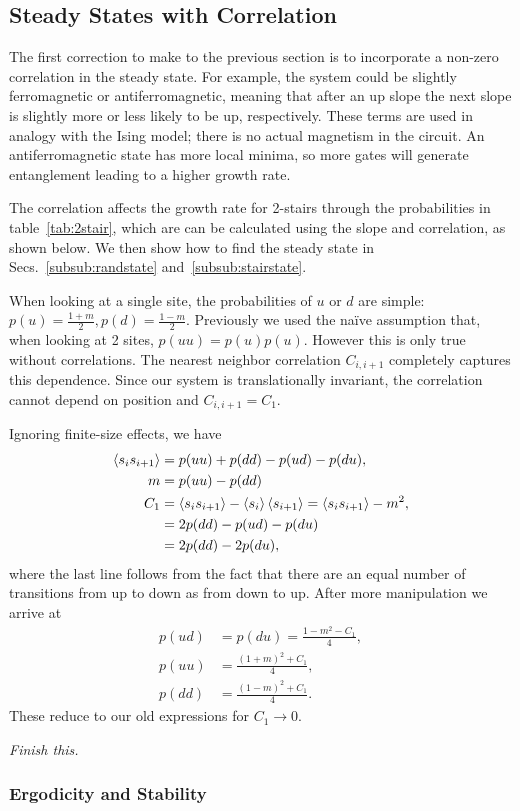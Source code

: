 \subsection{Steady States with Correlation} \label{sub:steadystate}

The first correction to make to the previous section is to incorporate a non-zero correlation in the steady state. For example, the system could be slightly ferromagnetic or antiferromagnetic, meaning that after an up slope the next slope is slightly more or less likely to be up, respectively. These terms are used in analogy with the Ising model; there is no actual magnetism in the circuit. An antiferromagnetic state has more local minima, so more gates will generate entanglement leading to a higher growth rate.

The correlation affects the growth rate for 2-stairs through the probabilities in table~\ref{tab:2stair}, which are can be calculated using the slope and correlation, as shown below. We then show how to find the steady state in Secs.~\ref{subsub:randstate} and~\ref{subsub:stairstate}.

When looking at a single site, the probabilities of $u$ or $d$ are simple: $p(u) = \frac{1+m}{2}, p(d) = \frac{1-m}{2}$. Previously we used the na\"ive assumption that, when looking at 2 sites, $p(uu) = p(u)p(u)$. However this is only true without correlations. The nearest neighbor correlation $C_{i,i+1}$ completely captures this dependence. Since our system is translationally invariant, the correlation cannot depend on position and $C_{i,i+1}=C_1$.

Ignoring finite-size effects, we have
\begin{align}
\left\langle s_is_{i+1} \right\rangle &= p(uu) + p(dd) - p(ud) - p(du),\nonumber\\
m &= p(uu) - p(dd)\nonumber\\
C_{1} &= \left\langle s_is_{i+1} \right\rangle-\left\langle s_i \right\rangle\left\langle s_{i+1} \right\rangle = \left\langle s_is_{i+1} \right\rangle - m^2,\nonumber\\
&= 2p(dd) -p(ud) - p(du)\nonumber\\
&= 2p(dd) - 2p(du),
\end{align}
where the last line follows from the fact that there are an equal number of transitions from up to down as from down to up. After more manipulation we arrive at 
\begin{align}
p(ud) &= p(du) = \frac{1-m^2-C_1}{4},\\
p(uu) &= \frac{(1+m)^2+C_1}{4},\\
p(dd) &= \frac{(1-m)^2+C_1}{4}.
\end{align}
These reduce to our old expressions for $C_1\to0$.

\emph{Finish this.}

\subsubsection{Ergodicity and Stability} \label{subsub:ergstab}

